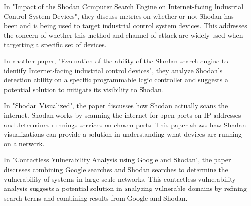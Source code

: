 



In "Impact of the Shodan Computer Search Engine on Internet-facing Industrial
Control System Devices"\cite{afit//CSAR-10-025-01}, they discuss metrics
on whether or not Shodan has been and is being used to target industrial control
system devices. This addresses the concern of whether this method and channel of
attack are widely used when targetting a specific set of devices.

In another paper, "Evaluation of the ability of the Shodan search engine to
identify Internet-facing industrial control devices"\cite{bodenheim_shodan_ics},
they analyze Shodan's detection ability on a specific programmable logic controller
and suggests a potential solution to mitigate its visibility to Shodan.

In "Shodan Visualized"\cite{shodan_vis}, the paper discusses how Shodan actually
scans the internet. Shodan works by scanning the internet for open ports on 
IP addresses and determines runnings services on chosen ports. This paper shows how 
Shodan visualizations can provide a solution in understanding what devices are running on a network.

In "Contactless Vulnerability Analysis using Google and Shodan"\cite{google_shodan},
the paper discusses combining Google searches and Shodan searches to determine
the vulnerability of systems in large scale networks. This contactless vulnerability
analysis suggests a potential solution in analyzing vulnerable domains by refining search terms and 
combining results from Google and Shodan.